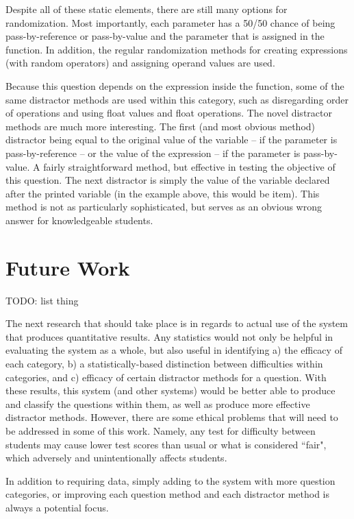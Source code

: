 \documentclass{article}
\begin{document}
Despite all of these static elements, there are still many options for randomization.  Most importantly, each parameter has a 50/50 chance of being pass-by-reference or pass-by-value and the parameter that is assigned in the function. In addition, the regular randomization methods for creating expressions (with random operators) and assigning operand values are used.

Because this question depends on the expression inside the function, some of the same distractor methods are used within this category, such as disregarding order of operations and
using float values and float operations. The novel distractor methods are much more interesting.
The first (and most obvious method) distractor being equal to the original value of the variable -- if the parameter is pass-by-reference -- or the value of the expression -- if the parameter is pass-by-value. A fairly straightforward method, but effective in testing the objective of this question. 
The next distractor is simply the value of the variable declared after the printed variable (in the example above, this would be item). This method is not as particularly sophisticated, but serves as an obvious wrong answer for knowledgeable students. 

\section{Future Work} \label{sec-future_work}

TODO: list thing

The next research that should take place is in regards to actual use of the system that produces quantitative results. Any statistics would not only be helpful in evaluating the system as a whole, but also useful in identifying a) the efficacy of each category, b) a statistically-based distinction between difficulties within categories, and c) efficacy of certain distractor methods for a question. With these results, this system (and other systems) would be better able to produce and classify the questions within them, as well as produce more effective distractor methods. However, there are some ethical problems that will need to be addressed in some of this work. Namely, any test for difficulty between students may cause lower test scores than usual or what is considered ``fair", which adversely and unintentionally affects students. 

In addition to requiring data, simply adding to the system with more question categories, or improving each question method and each distractor method is always a potential focus.
\end{document}

